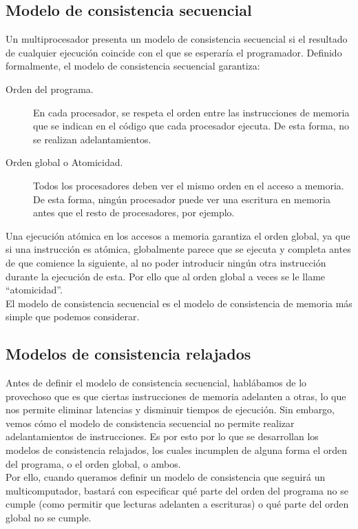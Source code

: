 \subsection{Modelo de consistencia secuencial}
Un multiprocesador presenta un modelo de consistencia secuencial si el resultado de cualquier ejecución coincide con el que se esperaría el programador. Definido formalmente, el modelo de consistencia secuencial garantiza: 
\begin{description}
    \item [Orden del programa.] En cada procesador, se respeta el orden entre las instrucciones de memoria que se indican en el código que cada procesador ejecuta. De esta forma, no se realizan adelantamientos.
    \item [Orden global o Atomicidad.] Todos los procesadores deben ver el mismo orden en el acceso a memoria. De esta forma, ningún procesador puede ver una escritura en memoria antes que el resto de procesadores, por ejemplo.
\end{description}
Una ejecución atómica en los accesos a memoria garantiza el orden global, ya que si una instrucción es atómica, globalmente parece que se ejecuta y completa antes de que comience la siguiente, al no poder introducir ningún otra instrucción durante la ejecución de esta. Por ello que al orden global a veces se le llame ``atomicidad''.\\

El modelo de consistencia secuencial es el modelo de consistencia de memoria más simple que podemos considerar.

\subsection{Modelos de consistencia relajados}
Antes de definir el modelo de consistencia secuencial, hablábamos de lo provechoso que es que ciertas instrucciones de memoria adelanten a otras, lo que nos permite eliminar latencias y disminuir tiempos de ejecución. Sin embargo, vemos cómo el modelo de consistencia secuencial no permite realizar adelantamientos de instrucciones. Es por esto por lo que se desarrollan los modelos de consistencia relajados, los cuales incumplen de alguna forma el orden del programa, o el orden global, o ambos.\\

Por ello, cuando queramos definir un modelo de consistencia que seguirá un multicomputador, bastará con especificar qué parte del orden del programa no se cumple (como permitir que lecturas adelanten a escrituras) o qué parte del orden global no se cumple.\\

